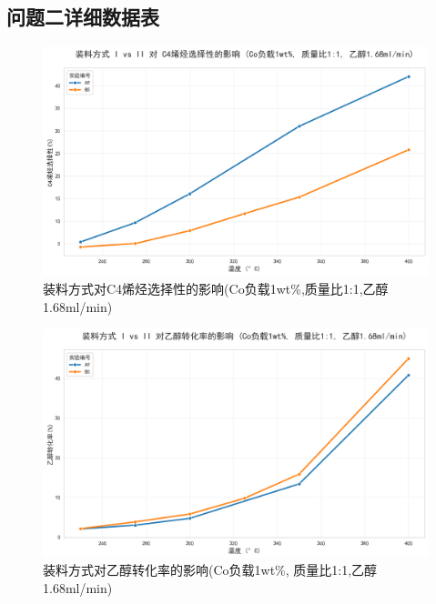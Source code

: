 \newpage

\subsection*{问题二详细数据表}

\begin{figure}[h]%
	\centering%
	\includegraphics [scale=0.6]{图/2-1-2-1.png}
	\caption{装料方式对C4烯烃选择性的影响(Co负载1wt\%,质量比1:1,乙醇1.68ml/min)} 
	\label{fig:1}
\end{figure}

\newpage

\begin{figure}[h]%
	\centering%
	\includegraphics [scale=0.6]{图/2-1-2-2.png}
	\caption{装料方式对乙醇转化率的影响(Co负载1wt\%, 质量比1:1,乙醇1.68ml/min)} 
	\label{fig:1}
\end{figure}

